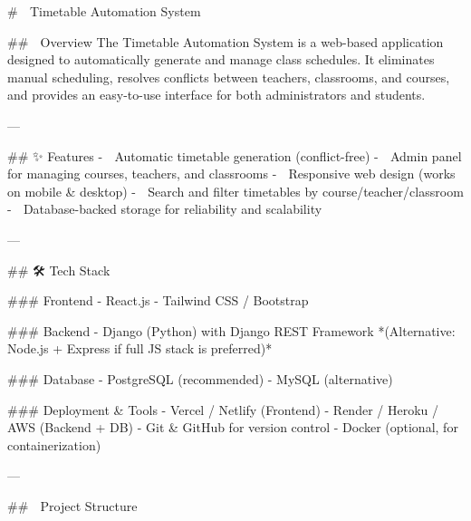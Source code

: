 # 📅 Timetable Automation System  

## 📖 Overview  
The Timetable Automation System is a web-based application designed to automatically generate and manage class schedules.  
It eliminates manual scheduling, resolves conflicts between teachers, classrooms, and courses, and provides an easy-to-use interface for both administrators and students.  

---

## ✨ Features  
- 🔹 Automatic timetable generation (conflict-free)  
- 🔹 Admin panel for managing courses, teachers, and classrooms  
- 🔹 Responsive web design (works on mobile & desktop)  
- 🔹 Search and filter timetables by course/teacher/classroom  
- 🔹 Database-backed storage for reliability and scalability  

---

## 🛠️ Tech Stack  

### Frontend  
- React.js  
- Tailwind CSS / Bootstrap  

### Backend  
- Django (Python) with Django REST Framework  
  *(Alternative: Node.js + Express if full JS stack is preferred)*  

### Database  
- PostgreSQL (recommended)  
- MySQL (alternative)  

### Deployment & Tools  
- Vercel / Netlify (Frontend)  
- Render / Heroku / AWS (Backend + DB)  
- Git & GitHub for version control  
- Docker (optional, for containerization)  

---

## 📂 Project Structure  

